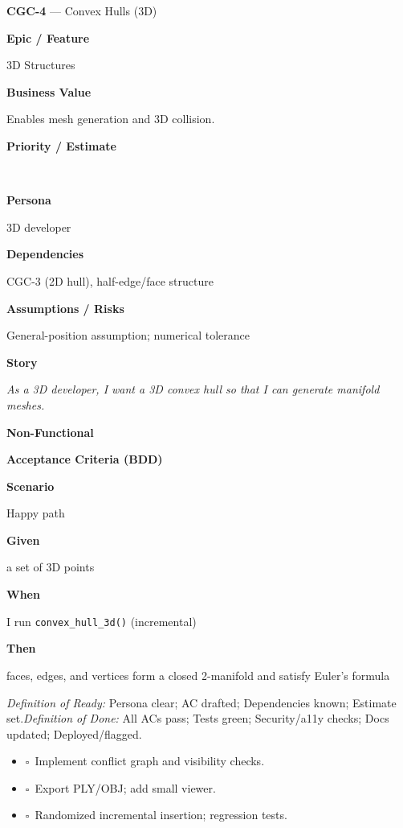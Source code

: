 \documentclass[11pt,a4paper]{article}
\newcommand{\MetaRow}[2]{%
  \noindent\begin{minipage}[t]{0.24\linewidth}\raggedleft\bfseries #1\end{minipage}%
  \hspace{0.8em}%
  \begin{minipage}[t]{0.72\linewidth}\raggedright #2\end{minipage}\par\vspace{0.3em}}
\newcommand{\CBox}{\(\square\)}
\newcommand{\BDDRow}[2]{\MetaRow{#1}{#2}}
\newenvironment{BDD}{\par\medskip}{\par\medskip}
\newcommand{\StoryTitle}[2]{\textbf{#1} --- #2}
\newcommand{\DoR}{\textit{Definition of Ready:} Persona clear; AC drafted; Dependencies known; Estimate set.}
\newcommand{\DoD}{\textit{Definition of Done:} All ACs pass; Tests green; Security/a11y checks; Docs updated; Deployed/flagged.}
\begin{document}
\begin{StoryCard}{\StoryTitle{CGC-4}{Convex Hulls (3D)}}
\MetaRow{Epic / Feature}{3D Structures}
\MetaRow{Business Value}{Enables mesh generation and 3D collision.}
\MetaRow{Priority / Estimate}{\ \ \Badge{SP: 5}}
\MetaRow{Persona}{3D developer}
\MetaRow{Dependencies}{CGC-3 (2D hull), half-edge/face structure}
\MetaRow{Assumptions / Risks}{General-position assumption; numerical tolerance}
\MetaRow{Story}{\emph{As a 3D developer, I want a 3D convex hull so that I can generate manifold meshes.}}

\medskip
\noindent\textbf{Non-Functional}\quad
{}\ 

\medskip
\noindent\textbf{Acceptance Criteria (BDD)}
\begin{BDD}
\BDDRow{Scenario}{Happy path}
\BDDRow{Given}{a set of 3D points}
\BDDRow{When}{I run \texttt{convex\_hull\_3d()} (incremental)}
\BDDRow{Then}{faces, edges, and vertices form a closed 2-manifold and satisfy Euler's formula}
\end{BDD}

\medskip
{\footnotesize \DoR\quad\textbullet\quad \DoD}
\end{StoryCard}

\begin{TaskBox}
\begin{itemize}
  \item \CBox\ Implement conflict graph and visibility checks.
  \item \CBox\ Export PLY/OBJ; add small viewer.
  \item \CBox\ Randomized incremental insertion; regression tests.
\end{itemize}
\end{TaskBox}

\clearpage
\end{document}
